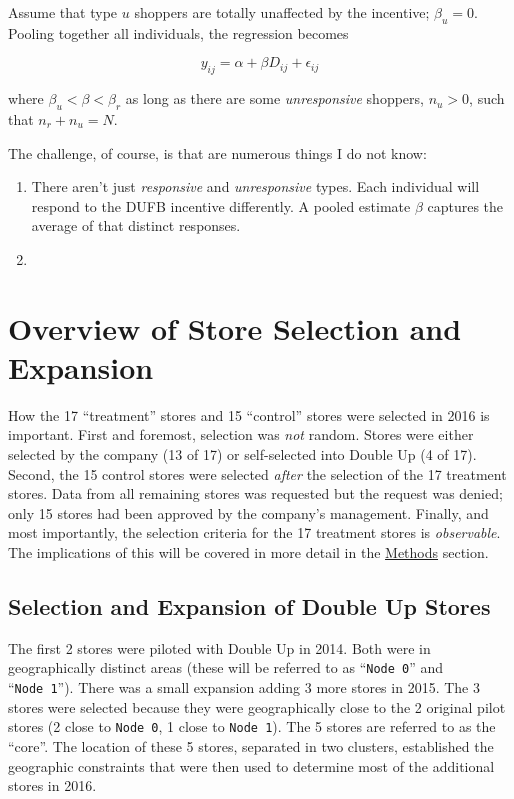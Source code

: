 \documentclass[12pt,letterpaperpaper,]{book}
\begin{document}
Assume that type \(u\) shoppers are totally unaffected by the incentive;
\(\beta_u = 0\). Pooling together all individuals, the regression
becomes

\[y_{ij} = \alpha + \beta D_{ij} + \epsilon_{ij}\]

where \(\beta_u < \beta < \beta_r\) as long as there are some
\emph{unresponsive} shoppers, \(n_{u} > 0\), such that
\(n_{r} + n_{u} = N\).

The challenge, of course, is that are numerous things I do not know:

\begin{enumerate}
\def\labelenumi{\arabic{enumi}.}
\item
  There aren't just \emph{responsive} and \emph{unresponsive} types.
  Each individual will respond to the DUFB incentive differently. A
  pooled estimate \(\beta\) captures the average of that distinct
  responses.
\item
\end{enumerate}

\hypertarget{store-selection-1}{\section*{Overview of Store Selection
and Expansion}\label{store-selection-1}}

How the 17 ``treatment'' stores and 15 ``control'' stores were selected
in 2016 is important. First and foremost, selection was \emph{not}
random. Stores were either selected by the company (13 of 17) or
self-selected into Double Up (4 of 17). Second, the 15 control stores
were selected \emph{after} the selection of the 17 treatment stores.
Data from all remaining stores was requested but the request was denied;
only 15 stores had been approved by the company's management. Finally,
and most importantly, the selection criteria for the 17 treatment stores
is \emph{observable}. The implications of this will be covered in more
detail in the \protect\hyperlink{methods}{Methods} section.

\subsection*{Selection and Expansion of Double Up
Stores}\label{selection-and-expansion-of-double-up-stores}

The first 2 stores were piloted with Double Up in 2014. Both were in
geographically distinct areas (these will be referred to as
``\texttt{Node\ 0}'' and ``\texttt{Node\ 1}''). There was a small
expansion adding 3 more stores in 2015. The 3 stores were selected
because they were geographically close to the 2 original pilot stores (2
close to \texttt{Node\ 0}, 1 close to \texttt{Node\ 1}). The 5 stores
are referred to as the ``core''. The location of these 5 stores,
separated in two clusters, established the geographic constraints that
were then used to determine most of the additional stores in 2016.
\end{document}
